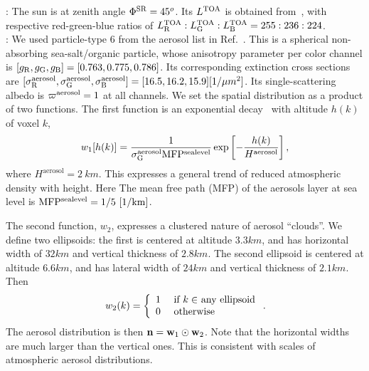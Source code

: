 \documentclass[10pt,twocolumn,letterpaper]{article}
\begin{document}
: The sun is at zenith angle $\Phi^{\rm SR}=45^o$. Its
$L^{\rm TOA}$ is obtained from~\cite{BBradiance,sun_composition}, with respective red-green-blue ratios of
 $L^{\rm TOA}_{\rm R}:L^{\rm TOA}_{\rm G}:L^{\rm TOA}_{\rm B}=255:236:224$.\\

: We used particle-type 6 from the aerosol list in
Ref.~\cite{Martonchik2009}. This is a spherical non-absorbing sea-salt/organic particle, whose anisotropy parameter per color channel is $[g_{\rm R},g_{\rm G},g_{\rm B}]=[0.763,0.775,0.786]$. Its corresponding extinction cross sections are
  $[\sigma^{\rm aerosol}_{\rm R},
    \sigma^{\rm aerosol}_{\rm G},
    \sigma^{\rm aerosol}_{\rm B}]=[16.5,16.2,15.9][1/\mu m^2]$.
Its single-scattering albedo is $\varpi^{\rm aerosol}=1$ at all channels.
We set the spatial distribution as a product of two functions. The first function is an exponential decay~\cite{Levi1980} with altitude $h(k)$ of voxel $k$,
\begin{align}
 w_1[h(k)] = \frac{1}
 {\sigma^{\rm aerosol}_{\rm G} \mathrm{MFP^{sea level}}}
  \exp\left[-\frac{h(k)}{H^\mathrm{aerosol}}\right],
\end{align}
where $H^\mathrm{aerosol}=2\ km$. This expresses a general trend of reduced atmospheric density with height. Here
The mean free path (MFP) of the aerosols layer at sea level is
$\mathrm{MFP^{sea level}}=1/5~{\rm[1/km]}$.

The second function, $w_2$, expresses a clustered nature of aerosol ``clouds''. We define two ellipsoids: the first is centered at altitude
$3.3km$, and has horizontal width of $32km$ and vertical thickness of $2.8km$. The second ellipsoid is centered at altitude $6.6km$, and has lateral width of $24km$ and vertical thickness of $2.1km$. Then
\begin{equation}
  w_2(k) =
  \left\{
      \begin{array}{ll}
          1  & \mbox{ if $k\in$ any ellipsoid} \\
          0  & \mbox{ otherwise}
    \label{eq:f2}
       \end{array}
  \right.
  .
  \hspace{-0.05cm}
\end{equation}
The aerosol distribution is then ${\bf n}={\bf w}_1\odot {\bf w}_2$.
Note that the horizontal widths are much larger than the vertical ones. This is consistent with scales of atmospheric aerosol distributions.\\
\end{document}
